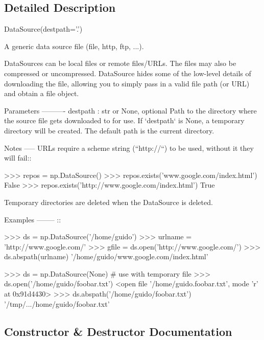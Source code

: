 \subsection{Detailed Description}
\begin{DoxyVerb}DataSource(destpath='.')

A generic data source file (file, http, ftp, ...).

DataSources can be local files or remote files/URLs.  The files may
also be compressed or uncompressed. DataSource hides some of the
low-level details of downloading the file, allowing you to simply pass
in a valid file path (or URL) and obtain a file object.

Parameters
----------
destpath : str or None, optional
    Path to the directory where the source file gets downloaded to for
    use.  If `destpath` is None, a temporary directory will be created.
    The default path is the current directory.

Notes
-----
URLs require a scheme string (``http://``) to be used, without it they
will fail::

    >>> repos = np.DataSource()
    >>> repos.exists('www.google.com/index.html')
    False
    >>> repos.exists('http://www.google.com/index.html')
    True

Temporary directories are deleted when the DataSource is deleted.

Examples
--------
::

    >>> ds = np.DataSource('/home/guido')
    >>> urlname = 'http://www.google.com/'
    >>> gfile = ds.open('http://www.google.com/')
    >>> ds.abspath(urlname)
    '/home/guido/www.google.com/index.html'

    >>> ds = np.DataSource(None)  # use with temporary file
    >>> ds.open('/home/guido/foobar.txt')
    <open file '/home/guido.foobar.txt', mode 'r' at 0x91d4430>
    >>> ds.abspath('/home/guido/foobar.txt')
    '/tmp/.../home/guido/foobar.txt'\end{DoxyVerb}
 

\subsection{Constructor \& Destructor Documentation}
\mbox{\label{classnumpy_1_1lib_1_1__datasource_1_1DataSource_a7bfdf9b0b7d6b4d8867e8f84b9cbed49}} 
